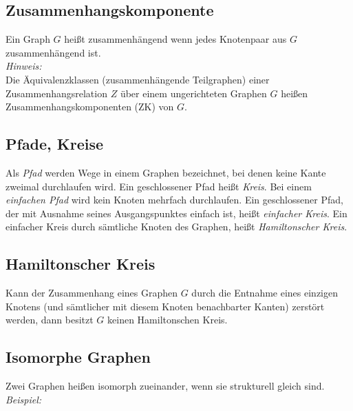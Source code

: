 \subsection*{Zusammenhangskomponente}
Ein Graph $G$ heißt zusammenhängend wenn jedes Knotenpaar aus $G$ zusammenhängend ist.\\
\emph{Hinweis:}\\
Die Äquivalenzklassen (zusammenhängende Teilgraphen) einer Zusammenhangsrelation $Z$ über einem ungerichteten Graphen $G$ heißen Zusammenhangskomponenten (ZK) von $G$.
\subsection*{Pfade, Kreise}
Als \emph{Pfad} werden Wege in einem Graphen bezeichnet, bei denen keine Kante zweimal durchlaufen wird.
Ein geschlossener Pfad heißt \emph{Kreis}. Bei einem \emph{einfachen Pfad} wird kein Knoten mehrfach durchlaufen.
Ein geschlossener Pfad, der mit Ausnahme seines Ausgangspunktes einfach ist, heißt \emph{einfacher Kreis}.
Ein einfacher Kreis durch sämtliche Knoten des Graphen, heißt \emph{Hamiltonscher Kreis}.
\subsection*{Hamiltonscher Kreis}
Kann der Zusammenhang eines Graphen $G$ durch die Entnahme eines einzigen Knotens (und
sämtlicher mit diesem Knoten benachbarter Kanten) zerstört werden, dann besitzt $G$ keinen
Hamiltonschen Kreis.
\subsection*{Isomorphe Graphen}
Zwei Graphen heißen isomorph zueinander, wenn sie strukturell gleich sind.\\
\emph{Beispiel:}\\

